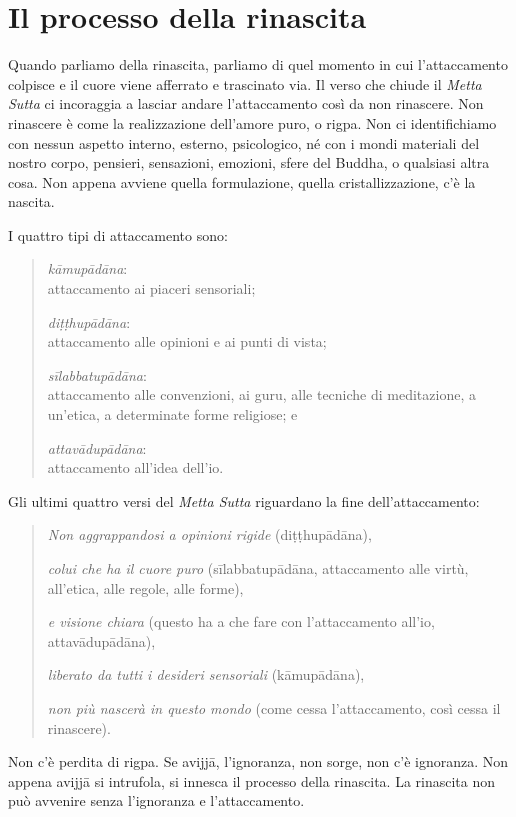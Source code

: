\section*{Il processo della rinascita}

Quando parliamo della rinascita, parliamo di quel momento in cui l'attaccamento colpisce e il cuore viene afferrato e trascinato via. Il verso che chiude il \textit{Metta Sutta} ci incoraggia a lasciar andare l'attaccamento così da non rinascere. Non rinascere è come la realizzazione dell'amore puro, o rigpa. Non ci identifichiamo con nessun aspetto interno, esterno, psicologico, né con i mondi materiali del nostro corpo, pensieri, sensazioni, emozioni, sfere del Buddha, o qualsiasi altra cosa. Non appena avviene quella formulazione, quella cristallizzazione, c'è la nascita.

I quattro tipi di attaccamento sono:

\begin{quote}
\textit{kāmupādāna}:\\ attaccamento ai piaceri sensoriali;

\textit{diṭṭhupādāna}:\\ attaccamento alle opinioni e ai punti di vista;

\textit{sīlabbatupādāna}:\\ attaccamento alle convenzioni, ai guru, alle tecniche di meditazione, a un'etica, a determinate forme religiose; e

\textit{attavādupādāna}:\\ attaccamento all'idea dell'io.
\end{quote}

Gli ultimi quattro versi del \textit{Metta Sutta} riguardano la fine dell'attaccamento:

\begin{quote}
\textit{Non aggrappandosi a opinioni rigide} (diṭṭhupādāna),

\textit{colui che ha il cuore puro} (sīlabbatupādāna, attaccamento alle virtù, all'etica, alle regole, alle forme),

\textit{e visione chiara} (questo ha a che fare con l'attaccamento all'io, attavādupādāna),

\textit{liberato da tutti i desideri sensoriali} (kāmupādāna),

\textit{non più nascerà in questo mondo} (come cessa l'attaccamento, così cessa il rinascere).
\end{quote}

Non c'è perdita di rigpa. Se avijjā, l'ignoranza, non sorge, non c'è ignoranza. Non appena avijjā si intrufola, si innesca il processo della rinascita. La rinascita non può avvenire senza l'ignoranza e l'attaccamento.

